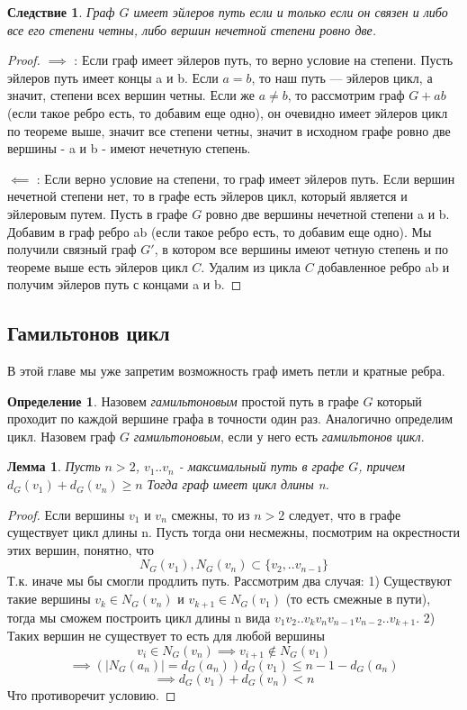 \documentclass{article}
\renewcommand{\le}{\leqslant}
\renewcommand{\ge}{\geqslant}
\newtheorem{lemma}{Лемма}
\newtheorem{consequence}{Следствие}
\theoremstyle{definition}
\newtheorem{definition}{Определение}[section]
\theoremstyle{remark}
\begin{document}
\begin{consequence}
     Граф $G$ имеет эйлеров путь если и только если он связен и либо все его степени четны, либо вершин нечетной степени ровно две.
\end{consequence}

\begin{proof}
        
    $\implies$ : Если граф имеет эйлеров путь, то верно условие на степени. Пусть эйлеров путь имеет концы a и b. Если $a = b$, то наш путь — эйлеров цикл, а значит, степени всех вершин четны. Если же $a \not= b$, то рассмотрим граф $G + ab$ (если такое ребро есть, то добавим еще одно), он очевидно имеет эйлеров цикл по теореме выше, значит все степени четны, значит в исходном графе ровно две вершины  - a и b - имеют нечетную степень.
    
    $\impliedby$ : Если верно условие на степени, то граф имеет эйлеров путь. 
    Если вершин нечетной степени нет, то в графе есть эйлеров цикл, который является и эйлеровым путем. Пусть в графе $G$ ровно две вершины нечетной степени a и b. Добавим
    в граф ребро ab (если такое ребро есть, то добавим еще одно). Мы получили связный граф $G'$, в котором все вершины имеют четную степень и по теореме выше есть эйлеров цикл $C$. Удалим из цикла $C$ добавленное ребро ab и получим эйлеров путь с концами a и b.
\end{proof}

\subsection{Гамильтонов цикл}

В этой главе мы уже запретим возможность граф иметь петли и кратные ребра.

\begin{definition}
    Назовем \textit{гамильтоновым} простой путь в графе $G$ который проходит по каждой вершине графа в точности один раз.  Аналогично определим цикл. Назовем граф $G$ \textit{гамильтоновым}, если у него есть \textit{гамильтонов цикл}.
\end{definition}

\label{lemma5}
\begin{lemma} 
    Пусть $n > 2$, $v_1..v_n$ - максимальный путь в графе $G$, причем $d_G(v_1) + d_G(v_n) \ge n$ Тогда граф имеет цикл длины n. 
\end{lemma}
\begin{proof}
    Если вершины $v_1$ и $v_n$ смежны, то из $n > 2$ следует, что в графе существует цикл длины n. Пусть тогда они несмежны, посмотрим на окрестности этих вершин, понятно, что 
    $$
    N_G(v_1), N_G(v_n) \subset \{v_2,..v_{n-1}\}
    $$
    Т.к. иначе мы бы смогли продлить путь.
    Рассмотрим два случая:
    1) Существуют такие вершины $v_k \in N_G(v_n)$ и $v_{k+1} \in N_G(v_1)$ (то есть смежные в пути), тогда мы сможем построить цикл длины n вида $v_1v_2..v_kv_nv_{n-1}v_{n-2}..v_{k+1}$.
    2) Таких вершин не существует то есть для любой вершины 
    $$v_i \in N_G(v_n) \implies v_{i+1} \notin N_G(v_1)$$
    $$ \implies ( |N_G(a_n)| = d_G(a_n) ) d_G(v_1) \le n - 1 - d_G(a_n) $$
    $$ \implies d_G(v_1) + d_G(v_n) < n$$
    Что противоречит условию.
\end{proof}
\end{document}
